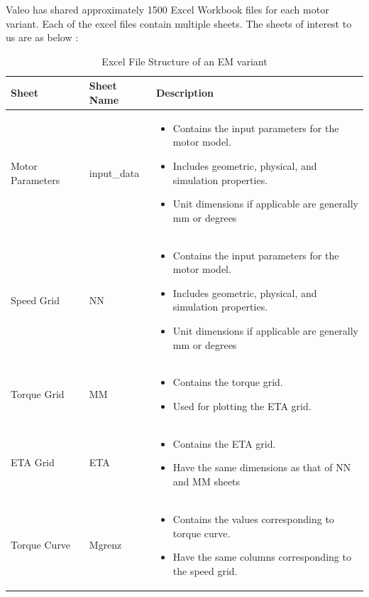 \documentclass{report} %
\begin{document}
Valeo has shared approximately 1500 Excel Workbook files for each motor variant. Each of the excel files contain multiple sheets.
The sheets of interest to us are as below :
\begin{table}[H]
    \centering
    \begin{tabular}{|p{2cm}|p{2cm}|p{11cm}|}
    \hline {\bf Sheet} & {\bf Sheet Name} & {\bf Description}\\
    \hline Motor Parameters & input\_data & 
    \begin{itemize}
        \item Contains the input parameters for the motor model.
        \item Includes geometric, physical, and simulation properties.
        \item Unit dimensions if applicable are generally mm or degrees 
    \end{itemize}\\
    Speed Grid & NN & 
    \begin{itemize}
        \item Contains the input parameters for the motor model.
        \item Includes geometric, physical, and simulation properties.
        \item Unit dimensions if applicable are generally mm or degrees 
    \end{itemize}\\
    Torque Grid & MM & 
    \begin{itemize}
        \item Contains the torque grid.
        \item Used for plotting the ETA grid.
    \end{itemize}\\
    ETA Grid & ETA & 
    \begin{itemize}
        \item Contains the ETA grid.
        \item Have the same dimensions as that of NN and MM sheets
    \end{itemize}\\
    Torque Curve & Mgrenz & 
    \begin{itemize}
        \item Contains the values corresponding to torque curve.
        \item Have the same columns corresponding to the speed grid.
    \end{itemize}\\
    \hline
    \end{tabular}
    \caption{Excel File Structure of an \ac{EM} variant}
    \label{tab:Excel File Structure}
\end{table}
\end{document}
